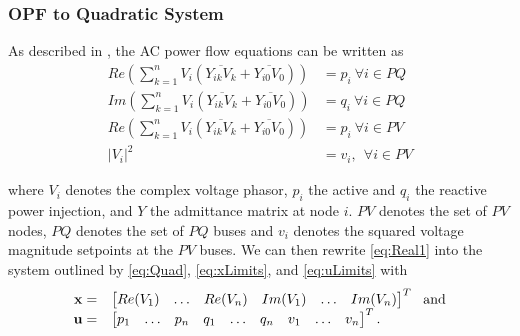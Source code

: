 \subsubsection{OPF to Quadratic System}
As described in \cite{DjTuritsyn}, the AC power flow equations can be written as 
\begin{equation}\label{eq:Real1}
	\begin{array}{rl}
	Re\left(\sum\limits_{k=1}^n V_i\left(\overline{Y_{ik}V_k} + \overline{Y_{i0}V_0}\right)\right) &= p_i \ \forall i\in PQ \\
	
	Im\left(\sum\limits_{k=1}^n V_i\left(\overline{Y_{ik}V_k} + \overline{Y_{i0}V_0}\right)\right) &= q_i \ \forall i\in PQ \\
	
	Re\left(\sum\limits_{k=1}^n V_i\left(\overline{Y_{ik}V_k} + \overline{Y_{i0}V_0}\right)\right) &= p_i \ \forall i\in PV \\ 
	
	|V_i|^2 &= v_i, \  \ \forall i \in PV 
	\end{array}
\end{equation}

where $V_i$ denotes the complex voltage phasor, $p_i$ the active and $q_i$ the reactive power injection, and $Y$ the admittance matrix at node $i$. $PV$ denotes the set of $PV$ nodes, $PQ$ denotes the set of $PQ$ buses and $v_i$ denotes the squared voltage magnitude setpoints at the $PV$ buses. We can then rewrite \cref{eq:Real1} into the system outlined by \cref{eq:Quad}, \cref{eq:xLimits}, and \cref{eq:uLimits} with 
\[
\begin{array}{rl}
\mathbf{x}= & \begin{bmatrix} Re(V_1) & \dots & Re(V_n) & Im(V_1) & \dots  &  Im(V_n) \end{bmatrix}^T ~~\mbox{and} \\
\mathbf{u}=& \begin{bmatrix} p_1 &  \dots &  p_n &  q_1 &  \dots &  q_n &  v_1 &  \dots &  v_n \end{bmatrix}^T.
\end{array}
\]



